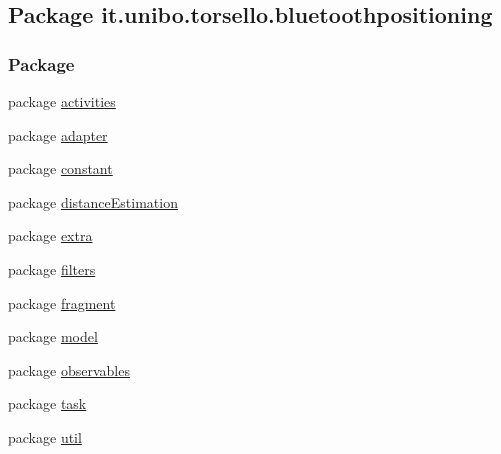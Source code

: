 \hypertarget{namespaceit_1_1unibo_1_1torsello_1_1bluetoothpositioning}{}\subsection{Package it.\+unibo.\+torsello.\+bluetoothpositioning}
\label{namespaceit_1_1unibo_1_1torsello_1_1bluetoothpositioning}
\subsubsection*{Package}
\begin{DoxyCompactItemize}
\item 
package \hyperlink{namespaceit_1_1unibo_1_1torsello_1_1bluetoothpositioning_1_1activities}{activities}
\item 
package \hyperlink{namespaceit_1_1unibo_1_1torsello_1_1bluetoothpositioning_1_1adapter}{adapter}
\item 
package \hyperlink{namespaceit_1_1unibo_1_1torsello_1_1bluetoothpositioning_1_1constant}{constant}
\item 
package \hyperlink{namespaceit_1_1unibo_1_1torsello_1_1bluetoothpositioning_1_1distanceEstimation}{distance\+Estimation}
\item 
package \hyperlink{namespaceit_1_1unibo_1_1torsello_1_1bluetoothpositioning_1_1extra}{extra}
\item 
package \hyperlink{namespaceit_1_1unibo_1_1torsello_1_1bluetoothpositioning_1_1filters}{filters}
\item 
package \hyperlink{namespaceit_1_1unibo_1_1torsello_1_1bluetoothpositioning_1_1fragment}{fragment}
\item 
package \hyperlink{namespaceit_1_1unibo_1_1torsello_1_1bluetoothpositioning_1_1model}{model}
\item 
package \hyperlink{namespaceit_1_1unibo_1_1torsello_1_1bluetoothpositioning_1_1observables}{observables}
\item 
package \hyperlink{namespaceit_1_1unibo_1_1torsello_1_1bluetoothpositioning_1_1task}{task}
\item 
package \hyperlink{namespaceit_1_1unibo_1_1torsello_1_1bluetoothpositioning_1_1util}{util}
\end{DoxyCompactItemize}
